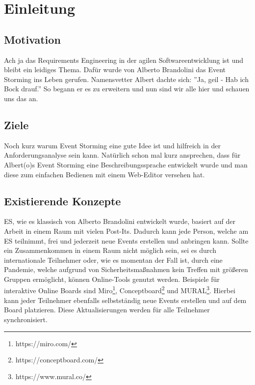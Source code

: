 \chapter{Einleitung}\label{ch:einleitung}

\section{Motivation}\label{sec:motivation}
Ach ja das Requirements Engineering in der agilen Softwareentwicklung ist
und bleibt ein leidiges Thema.
Dafür wurde von Alberto Brandolini das Event Storming ins Leben gerufen.
Namensvetter Albert dachte sich: ''Ja, geil - Hab ich Bock drauf.''
So begann er es zu erweitern und nun sind wir alle hier und schauen uns das an.

\section{Ziele}\label{sec:ziele}
Noch kurz warum Event Storming eine gute Idee ist und hilfreich in der
Anforderungsanalyse sein kann.
Natürlich schon mal kurz ansprechen, dass für Albert(o)s Event Storming eine
Beschreibungssprache entwickelt wurde und man diese zum einfachen Bedienen
mit einem Web-Editor versehen hat.

\section{Existierende Konzepte}\label{sec:existierende-konzepte}
\ac{ES}, wie es klassisch von Alberto Brandolini entwickelt wurde, basiert auf der Arbeit in einem Raum mit vielen Post-Its.
Dadurch kann jede Person, welche am \ac{ES} teilnimmt, frei und jederzeit neue Events erstellen und anbringen kann.
Sollte ein Zusammenkommen in einem Raum nicht möglich sein, sei es durch internationale Teilnehmer oder, wie es momentan der Fall ist,
durch eine Pandemie, welche aufgrund von Sicherheitsmaßnahmen kein Treffen mit größeren Gruppen ermöglicht, können Online-Tools genutzt werden.
Beispiele für interaktive Online Boards sind Miro\footnote{https://miro.com/}, Conceptboard\footnote{https://conceptboard.com/} und MURAL\footnote{https://www.mural.co/}.
Hierbei kann jeder Teilnehmer ebenfalls selbstständig neue Events erstellen und auf dem Board platzieren.
Diese Aktualisierungen werden für alle Teilnehmer synchronisiert.

